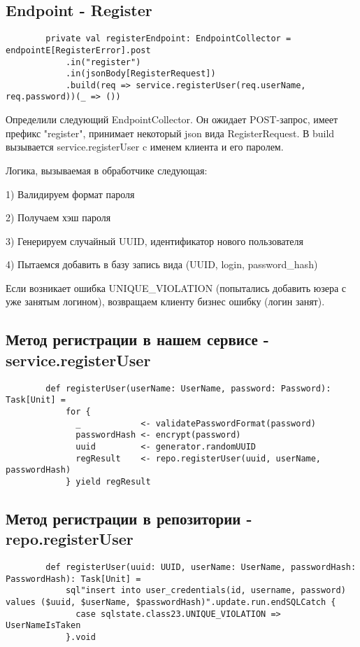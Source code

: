 \documentclass[14pt]{extarticle}
\begin{document}
    \subsection{Endpoint - Register}

    \begin{verbatim}
        private val registerEndpoint: EndpointCollector = endpointE[RegisterError].post
            .in("register")
            .in(jsonBody[RegisterRequest])
            .build(req => service.registerUser(req.userName, req.password))(_ => ())
    \end{verbatim}

    Определили следующий EndpointCollector.
    Он ожидает POST-запрос, имеет префикс "register", принимает некоторый json вида RegisterRequest.
    В build вызывается service.registerUser c именем клиента и его паролем.

    Логика, вызываемая в обработчике следующая:

    1) Валидируем формат пароля

    2) Получаем хэш пароля

    3) Генерируем случайный UUID, идентификатор нового пользователя

    4) Пытаемся добавить в базу запись вида (UUID, login, password\_hash)

    Если возникает ошибка UNIQUE\_VIOLATION (попытались добавить юзера с уже занятым логином),
    возвращаем клиенту бизнес ошибку (логин занят).

    \subsection{Метод регистрации в нашем сервисе - service.registerUser}
    \begin{verbatim}
        def registerUser(userName: UserName, password: Password): Task[Unit] =
            for {
              _            <- validatePasswordFormat(password)
              passwordHash <- encrypt(password)
              uuid         <- generator.randomUUID
              regResult    <- repo.registerUser(uuid, userName, passwordHash)
            } yield regResult
    \end{verbatim}

    \subsection{Метод регистрации в репозитории - repo.registerUser}
    \begin{verbatim}
        def registerUser(uuid: UUID, userName: UserName, passwordHash: PasswordHash): Task[Unit] =
            sql"insert into user_credentials(id, username, password) values ($uuid, $userName, $passwordHash)".update.run.endSQLCatch {
              case sqlstate.class23.UNIQUE_VIOLATION => UserNameIsTaken
            }.void
    \end{verbatim}
\end{document}
